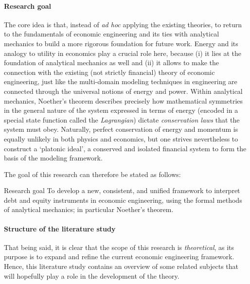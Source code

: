 \paragraph{Research goal} The core idea is that, instead of \emph{ad hoc} applying the existing theories, to return to the fundamentals of economic engineering and its ties with analytical mechanics to build a more rigorous foundation for future work. Energy and its analogy to utility in economics play a crucial role here, because (i) it lies at the foundation of analytical mechanics as well and (ii) it allows to make the connection with the existing (not strictly financial) theory of economic engineering, just like the multi-domain modeling techniques in engineering are connected through the universal notions of energy and power. Within analytical mechanics, Noether's theorem describes precisely how mathematical symmetries in the general nature of the system expressed in terms of energy (encoded in a special state function called the \emph{Lagrangian}) dictate \emph{conservation laws} that the system must obey. Naturally, perfect conservation of energy and momentum is equally unlikely in both physics and economics, but one strives nevertheless to construct a `platonic ideal', a conserved and isolated financial system to form the basis of the modeling framework.

The goal of this research can therefore be stated as follows: 
\begin{block}{Research goal}
    To develop a new, consistent, and unified framework to interpret debt and equity instruments in economic engineering, using the formal methods of analytical mechanics; in particular Noether's theorem.
\end{block}
\paragraph{Structure of the literature study} That being said, it is clear that the scope of this research is \emph{theoretical}, as its purpose is to expand and refine the current economic engineering framework. Hence, this literature study contains an overview of some related subjects that will hopefully play a role in the development of the theory.

